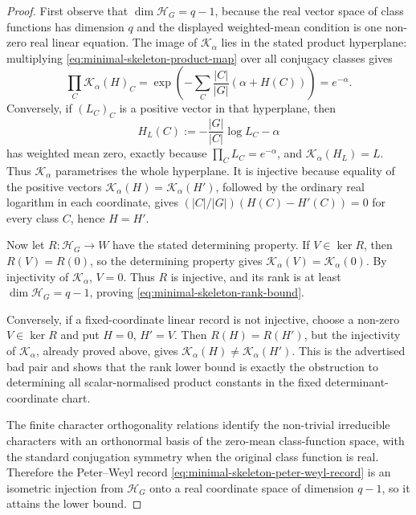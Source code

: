 \documentclass[11pt,a4paper]{amsart}
\theoremstyle{plain}
\theoremstyle{definition}
\theoremstyle{remark}
\begin{document}
\begin{proof}
  First observe that \(\dim\mathcal H_G=q-1\), because the real vector space
  of class functions has dimension \(q\) and the displayed weighted-mean
  condition is one non-zero real linear equation.  The image of
  \(\mathcal K_\alpha\) lies in the stated product hyperplane: multiplying
  \eqref{eq:minimal-skeleton-product-map} over all conjugacy classes gives
  \[
    \prod_C\mathcal K_\alpha(H)_C
    =
    \exp\!\left(-\sum_C\frac{|C|}{|G|}(\alpha+H(C))\right)
    =e^{-\alpha}.
  \]
  Conversely, if \((L_C)_C\) is a positive vector in that hyperplane, then
  \[
    H_L(C):=-\frac{|G|}{|C|}\log L_C-\alpha
  \]
  has weighted mean zero, exactly because \(\prod_C L_C=e^{-\alpha}\), and
  \(\mathcal K_\alpha(H_L)=L\).  Thus \(\mathcal K_\alpha\) parametrises the
  whole hyperplane.  It is injective because equality of the positive
  vectors \(\mathcal K_\alpha(H)=\mathcal K_\alpha(H')\), followed by the
  ordinary real logarithm in each coordinate, gives
  \((|C|/|G|)(H(C)-H'(C))=0\) for every class \(C\), hence \(H=H'\).

  Now let \(R:\mathcal H_G\to W\) have the stated determining property.  If
  \(V\in\ker R\), then \(R(V)=R(0)\), so the determining property gives
  \(\mathcal K_\alpha(V)=\mathcal K_\alpha(0)\).  By injectivity of
  \(\mathcal K_\alpha\), \(V=0\).  Thus \(R\) is injective, and its rank is at
  least \(\dim\mathcal H_G=q-1\), proving
  \eqref{eq:minimal-skeleton-rank-bound}.

  Conversely, if a fixed-coordinate linear record is not injective, choose a
  non-zero \(V\in\ker R\) and put \(H=0\), \(H'=V\).  Then
  \(R(H)=R(H')\), but the injectivity of \(\mathcal K_\alpha\), already proved
  above, gives
  \(\mathcal K_\alpha(H)\ne\mathcal K_\alpha(H')\).  This is the advertised bad
  pair and shows that the rank lower bound is exactly the obstruction to
  determining all scalar-normalised product constants in the fixed
  determinant-coordinate chart.

  The finite character orthogonality relations identify the non-trivial
  irreducible characters with an orthonormal basis of the zero-mean
  class-function space, with the standard conjugation symmetry when the
  original class function is real.  Therefore the Peter--Weyl record
  \eqref{eq:minimal-skeleton-peter-weyl-record} is an isometric injection
  from \(\mathcal H_G\) onto a real coordinate space of dimension \(q-1\), so
  it attains the lower bound.


\end{proof}
\end{document}
